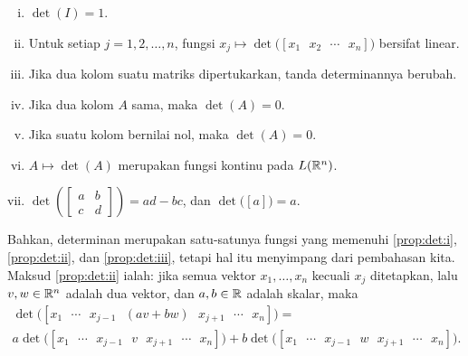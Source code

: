 \begin{prop}
\pagebreak[0]
\leavevmode
\begin{enumerate}[(i)]
\item \label{prop:det:i} $\det(I) = 1$.
\item \label{prop:det:ii} Untuk setiap $j=1,2,\ldots,n$, fungsi $x_j
\mapsto \det\bigl([x_1 ~~~ x_2 ~~~ \cdots ~~~ x_n ]\bigr)$
bersifat linear.
\item \label{prop:det:iii} Jika dua kolom suatu matriks dipertukarkan, tanda determinannya
berubah.
\item \label{prop:det:iv} Jika dua kolom $A$ sama, maka $\det(A) = 0$.
\item \label{prop:det:v} Jika suatu kolom bernilai nol, maka $\det(A) = 0$.
\item \label{prop:det:vi} $A \mapsto \det(A)$ merupakan fungsi kontinu pada
$L({\mathbb{R}}^n)$.
\item \label{prop:det:vii} $\det\left( \left[\begin{smallmatrix} a & b \\ c
&d \end{smallmatrix}\right] \right)
= ad-bc$, dan $\det \bigl( [a] \bigr) = a$.
\end{enumerate}
\end{prop}

Bahkan, determinan merupakan satu-satunya fungsi yang memenuhi
\ref{prop:det:i},
\ref{prop:det:ii}, dan
\ref{prop:det:iii},
tetapi hal itu menyimpang dari pembahasan kita.
Maksud \ref{prop:det:ii} ialah: jika semua vektor
$x_1,\ldots,x_n$ kecuali $x_j$ ditetapkan, lalu
$v,w \in {\mathbb{R}}^n$ adalah dua vektor,
dan $a,b \in {\mathbb{R}}$ adalah skalar, maka
\begin{multline*}
\det\bigl([x_1 ~~~ \cdots ~~~ x_{j-1} ~~~ (av+bw) ~~~ x_{j+1} ~~~
\cdots ~~~ x_n]\bigr) =
\\
a \det\bigl([x_1 ~~~ \cdots ~~~ x_{j-1} ~~~ v ~~~ x_{j+1} ~~~
\cdots ~~~ x_n]\bigr)
+
b
\det\bigl([x_1 ~~~ \cdots ~~~ x_{j-1} ~~~ w ~~~ x_{j+1} ~~~ \cdots
~~~ x_n]\bigr) .
\end{multline*}

